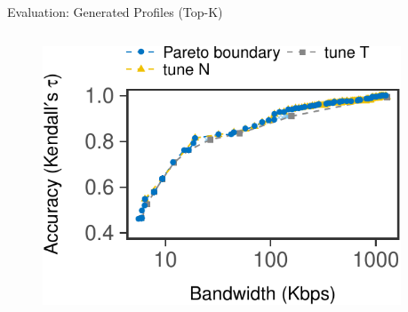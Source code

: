 \begin{frame}{Evaluation: Generated Profiles (Top-K)}
  \begin{columns}
    \begin{column}{0.45\textwidth}
      \begin{figure}
        \centering
        \includegraphics[width=\textwidth]{figures/profile-topk.pdf}
      \end{figure}
    \end{column}
    \begin{column}{0.55\textwidth}
      \begin{itemize}
      \end{itemize}
    \end{column}
  \end{columns}
\end{frame}

